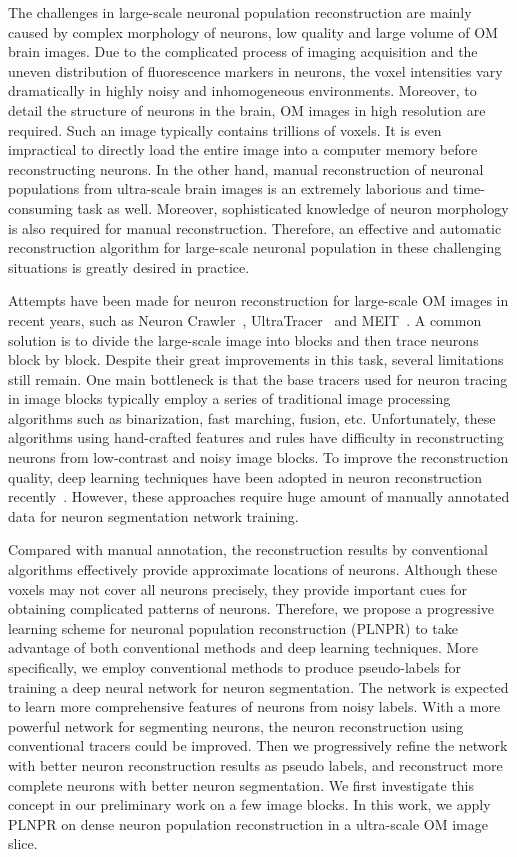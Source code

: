 The challenges in large-scale neuronal population reconstruction are mainly caused by complex morphology of neurons, low quality and large volume of OM brain images.
Due to the complicated process of imaging acquisition and the uneven distribution of fluorescence markers in neurons, the voxel intensities vary dramatically in highly noisy and inhomogeneous environments.
Moreover, to detail the structure of neurons in the brain, OM images in high resolution are required. Such an image typically contains trillions of voxels. It is even impractical to directly load the entire image into a computer memory before reconstructing neurons.
In the other hand, manual reconstruction of neuronal populations from ultra-scale brain images is an extremely laborious and time-consuming task as well.
Moreover, sophisticated knowledge of neuron morphology is also required for manual reconstruction.
%
Therefore, an effective and automatic reconstruction algorithm for large-scale neuronal population in these challenging situations is greatly desired in practice.
 
 
Attempts have been made for neuron reconstruction for large-scale OM images in recent years, such as Neuron Crawler~\cite{Zhou2015}, UltraTracer~\cite{Peng2017} and MEIT~\cite{Wang2018}.
A common solution is to divide the large-scale image into blocks and then trace neurons block by block.
Despite their great improvements in this task, several limitations still remain.
%
One main bottleneck is that the base tracers used for neuron tracing in image blocks typically employ a series of traditional image processing algorithms such as binarization, fast marching, fusion, etc. 
Unfortunately, these algorithms using hand-crafted features and rules have difficulty in reconstructing neurons from low-contrast and noisy image blocks.
To improve the reconstruction quality, deep learning techniques have been adopted in neuron reconstruction recently~\cite{Xu2016, Li2017, Zhou2018, Kozinski-MIA2020}. 
However, these approaches require huge amount of manually annotated data for neuron segmentation network training.
%

Compared with manual annotation, the reconstruction results by conventional algorithms effectively provide approximate locations of neurons. 
Although these voxels may not cover all neurons precisely, they provide important cues for obtaining complicated patterns of neurons.
Therefore, we propose a progressive learning scheme for neuronal population reconstruction (PLNPR) to take advantage of both conventional methods and deep learning techniques.
More specifically, we employ conventional methods to produce pseudo-labels for training a deep neural network for neuron segmentation. 
The network is expected to learn more comprehensive features of neurons from noisy labels. 
With a more powerful network for segmenting neurons, the neuron reconstruction using conventional tracers could be improved. 
Then we progressively refine the network with better neuron reconstruction results as pseudo labels, and reconstruct more complete neurons with better neuron segmentation.
We first investigate this concept in our preliminary work \cite{Zhao2019} on a few image blocks. 
In this work, we apply PLNPR on dense neuron population reconstruction in a ultra-scale OM image slice. 

